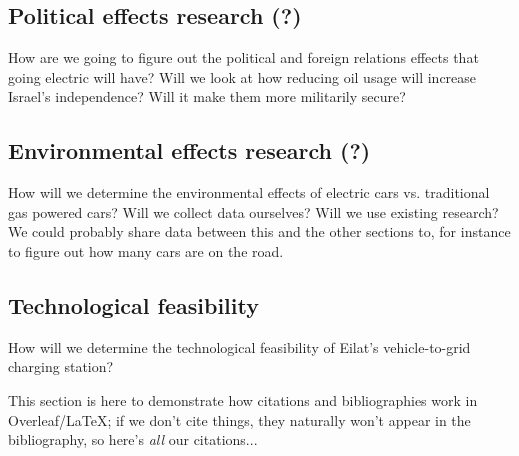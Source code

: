\documentclass{article}
\begin{document}
\subsection{Political effects research (?)}
How are we going to figure out the political and foreign relations effects that going electric will have? Will we look at how reducing oil usage will increase Israel's independence? Will it make them more militarily secure?

\subsection{Environmental effects research (?)}
How will we determine the environmental effects of electric cars vs. traditional gas powered cars? Will we collect data ourselves? Will we use existing research? We could probably share data between this and the other sections to, for instance to figure out how many cars are on the road.

\subsection{Technological feasibility}
How will we determine the technological feasibility of Eilat's vehicle-to-grid charging station?

\bigskip
This section is here to demonstrate how citations and bibliographies work in Overleaf/\LaTeX; if we don't cite things, they naturally won't appear in the bibliography, so here's \textit{all} our citations...

\cite{Cheslow2011BetterCountry, Zhu2015DistributedGrid, Bennett2015EconomicGrid, Shinde2018ElectricInfrastructure, Ustun2015ImpactSystems, Ustun2015ImpactSystems, Lu2015IntroductionPEVs, OraCorenIsraelLane, Larkin2008IsraelsDependence, IsraeliMinistryofEnergyIsraelsEconomy, Leskarac2015PEVOn, Rahman2015PowerEVs, Rahman2015PowerEVs, Mahmud2015PowerEV, Mullan2012TheConcept}

\newpage


\end{document}
